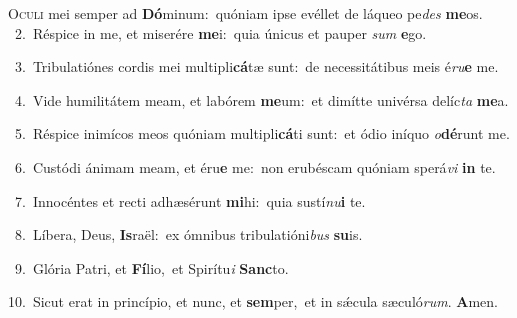 \lettrine{\initial\textcolor{\initialcolor}{O}}{culi} mei semper ad \textbf{Dó}\-minum:~\star quóniam ipse evéllet de láqueo pe\textit{des} \textbf{me}\-os.\\
{\numbfont\textcolor{\numbcolor}{~2.}}~Réspice in me, et miserére \textbf{me}\-i:~\star quia únicus et pauper \textit{sum} \textbf{e}\-go.\par
{\numbfont\textcolor{\numbcolor}{~3.}}~Tribulatiónes cordis mei multipli\-\textbf{cá}\-tæ sunt:~\star de necessitátibus meis é\-\textit{ru}\-\textbf{e} me.\par
{\numbfont\textcolor{\numbcolor}{~4.}}~Vide humilitátem meam, et labórem \textbf{me}\-um:~\star et dimítte univérsa delíc\textit{ta} \textbf{me}\-a.\par
{\numbfont\textcolor{\numbcolor}{~5.}}~Réspice inimícos meos quóniam multipli\-\textbf{cá}\-ti sunt:~\star et ódio iníquo \textit{o}\-\textbf{dé}runt me.\par
{\numbfont\textcolor{\numbcolor}{~6.}}~Custódi ánimam meam, et éru\textbf{e} me:~\star non erubéscam quóniam sperá\textit{vi} \textbf{in} te.\par
{\numbfont\textcolor{\numbcolor}{~7.}}~Innocéntes et recti adhæsérunt \textbf{mi}\-hi:~\star quia sustí\-\textit{nu}\-\textbf{i} te.\par
{\numbfont\textcolor{\numbcolor}{~8.}}~Líbera, Deus, \textbf{Is}\-raël:~\star ex ómnibus tribulatióni\textit{bus} \textbf{su}\-is.\par
{\numbfont\textcolor{\numbcolor}{~9.}}~Glória Patri, et \textbf{Fí}\-lio,~\star et Spirítu\textit{i} \textbf{Sanc}\-to.\par
{\numbfont\textcolor{\numbcolor}{10.}}~Sicut erat in princípio, et nunc, et \textbf{sem}\-per,~\star et in sǽcula sæculó\-\textit{rum}\-. \textbf{A}\-men.\par
